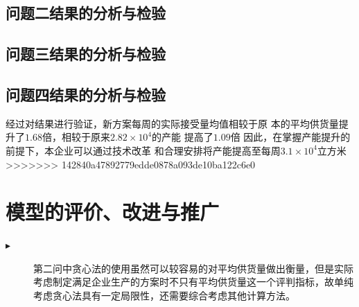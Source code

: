 \documentclass{cumcmthesis}
\begin{document}
\subsection{问题二结果的分析与检验}
\subsection{问题三结果的分析与检验}
\subsection{问题四结果的分析与检验}
经过对结果进行验证，新方案每周的实际接受量均值相较于原
本的平均供货量提升了$1.68$倍，相较于原来$2.82 \times 10^4$的产能
提高了$1.09$倍
因此，在掌握产能提升的前提下，本企业可以通过技术改革
和合理安排将产能提高至每周$3.1 \times 10^ 4$立方米
>>>>>>> 142840a47892779edde0878a093de10ba122c6e0

\section{模型的评价、改进与推广}
\begin{description}
    \item[$\blacktriangleright$] 第二问中贪心法的使用虽然可以较容易的对平均供货量做出衡量，但是实际考虑制定满足企业生产的方案时不只有平均供货量这一个评判指标，故单纯考虑贪心法具有一定局限性，还需要综合考虑其他计算方法。
\end{description}
\end{document}
